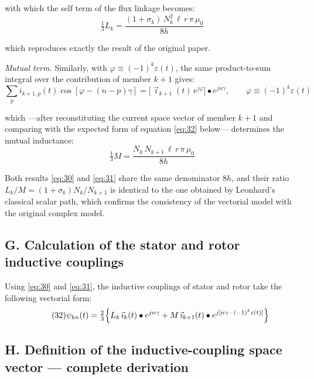\documentclass[11pt,a4paper]{article}
\begin{document}
with which the self term of the flux linkage becomes:
\begin{equation}\tag{30}\label{eq:30}
\tfrac13 L_k = \frac{(1+\sigma_k)\,N_k^{2}\,\ell\, r\,\pi\,\mu_0}{8h}
\end{equation}

which reproduces exactly the result of the original paper.

\emph{Mutual term.} Similarly, with $\varphi\equiv(-1)^k\varepsilon(t)$, the same product-to-sum integral over the contribution of member $k+1$ gives:
\begin{equation}\tag{30a}\label{eq:30a}
\sum_p i_{k+1,p}(t)\cos[\varphi-(n-p)\gamma] = \bigl[\vec\imath_{k+1}(t)\,e^{j\varphi}\bigr]\bullet e^{jn\gamma},\qquad \varphi\equiv(-1)^k\varepsilon(t)
\end{equation}

which ---after reconstituting the current space vector of member $k+1$ and comparing with the expected form of equation \eqref{eq:32} below--- determines the mutual inductance:
\begin{equation}\tag{31}\label{eq:31}
\tfrac13 M = \frac{N_k\,N_{k+1}\,\ell\, r\,\pi\,\mu_0}{8h}
\end{equation}

Both results \eqref{eq:30} and \eqref{eq:31} share the same denominator $8h$, and their ratio $L_k/M=(1+\sigma_k)N_k/N_{k+1}$ is identical to the one obtained by Leonhard's classical scalar path, which confirms the consistency of the vectorial model with the original complex model.

\subsection*{G. Calculation of the stator and rotor inductive couplings}

Using \eqref{eq:30} and \eqref{eq:31}, the inductive couplings of stator and rotor take the following vectorial form:
\begin{equation}\tag{32}\label{eq:32}
\psi_{kn}(t) = \tfrac23\Bigl\{L_k\,\vec\imath_k(t)\bullet e^{jn\gamma} + M\,\vec\imath_{k+1}(t)\bullet e^{j[n\gamma-(-1)^k\varepsilon(t)]}\Bigr\}
\end{equation}

\subsection*{H. Definition of the inductive-coupling space vector --- complete derivation}
\end{document}
